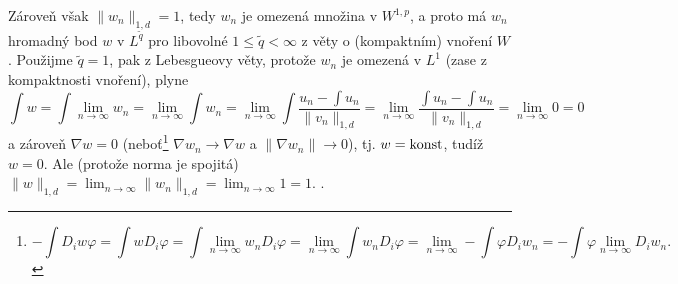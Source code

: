 \documentclass[12pt]{article}					%
\begin{document}
\begin{priklad}[1.]
\begin{reseni}[b, pokračování]
		Zároveň však $\|w_n\|_{1, d} = 1$, tedy $w_n$ je omezená množina v $W^{1, p}$, a proto má $w_n$ hromadný bod $w$ v $L^{\tilde q}$ pro libovolné $1 ≤ \tilde q < ∞$ z věty o (kompaktním) vnoření $W$. Použijme $\tilde q = 1$, pak z Lebesgueovy věty, protože $w_n$ je omezená v $L^1$ (zase z kompaktnosti vnoření), plyne
		$$ \int w = \int \lim_{n \rightarrow ∞}w_n = \lim_{n \rightarrow ∞} \int w_n = \lim_{n \rightarrow ∞} \int \frac{u_n - \int u_n}{\|v_n\|_{1, d}} = \lim_{n \rightarrow ∞} \frac{\int u_n - \int u_n}{\|v_n\|_{1, d}} = \lim_{n \rightarrow ∞} 0 = 0 $$
		a zároveň $\nabla w = 0$ (neboť\footnote{$$ -\int D_i w φ = \int w D_iφ = \int \lim_{n \rightarrow ∞}w_n D_i φ = \lim_{n \rightarrow ∞} \int w_n D_iφ = \lim_{n \rightarrow ∞} - \int φD_i w_n = - \int φ \lim_{n \rightarrow ∞}D_i w_n. $$} $\nabla w_n \rightarrow \nabla w$ a $\|\nabla w_n\| \rightarrow 0$), tj. $w = \operatorname{konst}$, tudíž $w = 0$. Ale (protože norma je spojitá) $\|w\|_{1, d} = \lim_{n \rightarrow ∞} \|w_n\|_{1, d} = \lim_{n \rightarrow ∞} 1 = 1$. \lightning.
	\end{reseni}
\end{priklad}
\end{document}
